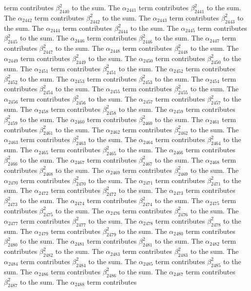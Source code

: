 \begin{lemma}
term contributes $\beta_{2440}^{2}$ to the sum. The $\alpha_{2441}$ term contributes $\beta_{2441}^{2}$ to the sum. The $\alpha_{2442}$ term contributes $\beta_{2442}^{2}$ to the sum. The $\alpha_{2443}$ term contributes $\beta_{2443}^{2}$ to the sum. The $\alpha_{2444}$ term contributes $\beta_{2444}^{2}$ to the sum. The $\alpha_{2445}$ term contributes $\beta_{2445}^{2}$ to the sum. The $\alpha_{2446}$ term contributes $\beta_{2446}^{2}$ to the sum. The $\alpha_{2447}$ term contributes $\beta_{2447}^{2}$ to the sum. The $\alpha_{2448}$ term contributes $\beta_{2448}^{2}$ to the sum. The $\alpha_{2449}$ term contributes $\beta_{2449}^{2}$ to the sum. The $\alpha_{2450}$ term contributes $\beta_{2450}^{2}$ to the sum. The $\alpha_{2451}$ term contributes $\beta_{2451}^{2}$ to the sum. The $\alpha_{2452}$ term contributes $\beta_{2452}^{2}$ to the sum. The $\alpha_{2453}$ term contributes $\beta_{2453}^{2}$ to the sum. The $\alpha_{2454}$ term contributes $\beta_{2454}^{2}$ to the sum. The $\alpha_{2455}$ term contributes $\beta_{2455}^{2}$ to the sum. The $\alpha_{2456}$ term contributes $\beta_{2456}^{2}$ to the sum. The $\alpha_{2457}$ term contributes $\beta_{2457}^{2}$ to the sum. The $\alpha_{2458}$ term contributes $\beta_{2458}^{2}$ to the sum. The $\alpha_{2459}$ term contributes $\beta_{2459}^{2}$ to the sum. The $\alpha_{2460}$ term contributes $\beta_{2460}^{2}$ to the sum. The $\alpha_{2461}$ term contributes $\beta_{2461}^{2}$ to the sum. The $\alpha_{2462}$ term contributes $\beta_{2462}^{2}$ to the sum. The $\alpha_{2463}$ term contributes $\beta_{2463}^{2}$ to the sum. The $\alpha_{2464}$ term contributes $\beta_{2464}^{2}$ to the sum. The $\alpha_{2465}$ term contributes $\beta_{2465}^{2}$ to the sum. The $\alpha_{2466}$ term contributes $\beta_{2466}^{2}$ to the sum. The $\alpha_{2467}$ term contributes $\beta_{2467}^{2}$ to the sum. The $\alpha_{2468}$ term contributes $\beta_{2468}^{2}$ to the sum. The $\alpha_{2469}$ term contributes $\beta_{2469}^{2}$ to the sum. The $\alpha_{2470}$ term contributes $\beta_{2470}^{2}$ to the sum. The $\alpha_{2471}$ term contributes $\beta_{2471}^{2}$ to the sum. The $\alpha_{2472}$ term contributes $\beta_{2472}^{2}$ to the sum. The $\alpha_{2473}$ term contributes $\beta_{2473}^{2}$ to the sum. The $\alpha_{2474}$ term contributes $\beta_{2474}^{2}$ to the sum. The $\alpha_{2475}$ term contributes $\beta_{2475}^{2}$ to the sum. The $\alpha_{2476}$ term contributes $\beta_{2476}^{2}$ to the sum. The $\alpha_{2477}$ term contributes $\beta_{2477}^{2}$ to the sum. The $\alpha_{2478}$ term contributes $\beta_{2478}^{2}$ to the sum. The $\alpha_{2479}$ term contributes $\beta_{2479}^{2}$ to the sum. The $\alpha_{2480}$ term contributes $\beta_{2480}^{2}$ to the sum. The $\alpha_{2481}$ term contributes $\beta_{2481}^{2}$ to the sum. The $\alpha_{2482}$ term contributes $\beta_{2482}^{2}$ to the sum. The $\alpha_{2483}$ term contributes $\beta_{2483}^{2}$ to the sum. The $\alpha_{2484}$ term contributes $\beta_{2484}^{2}$ to the sum. The $\alpha_{2485}$ term contributes $\beta_{2485}^{2}$ to the sum. The $\alpha_{2486}$ term contributes $\beta_{2486}^{2}$ to the sum. The $\alpha_{2487}$ term contributes $\beta_{2487}^{2}$ to the sum. The $\alpha_{2488}$ term contributes 
\end{lemma}
